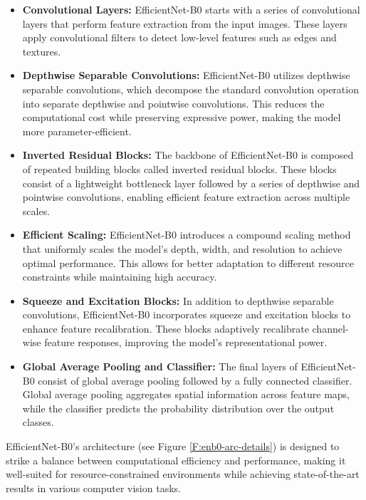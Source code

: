 \documentclass[12pt, a4paper, twoside]{article}
\begin{document}
			\begin{itemize}
				\item \textbf{Convolutional Layers:} EfficientNet-B0 starts with a series of convolutional layers that perform feature extraction from the input images. These layers apply convolutional filters to detect low-level features such as edges and textures.
				
				\item \textbf{Depthwise Separable Convolutions:} EfficientNet-B0 utilizes depthwise separable convolutions, which decompose the standard convolution operation into separate depthwise and pointwise convolutions. This reduces the computational cost while preserving expressive power, making the model more parameter-efficient.
				
				\item \textbf{Inverted Residual Blocks:} The backbone of EfficientNet-B0 is composed of repeated building blocks called inverted residual blocks. These blocks consist of a lightweight bottleneck layer followed by a series of depthwise and pointwise convolutions, enabling efficient feature extraction across multiple scales.
				
				\item \textbf{Efficient Scaling:} EfficientNet-B0 introduces a compound scaling method that uniformly scales the model's depth, width, and resolution to achieve optimal performance. This allows for better adaptation to different resource constraints while maintaining high accuracy.
				
				\item \textbf{Squeeze and Excitation Blocks:} In addition to depthwise separable convolutions, EfficientNet-B0 incorporates squeeze and excitation blocks to enhance feature recalibration. These blocks adaptively recalibrate channel-wise feature responses, improving the model's representational power.
				
				\item \textbf{Global Average Pooling and Classifier:} The final layers of EfficientNet-B0 consist of global average pooling followed by a fully connected classifier. Global average pooling aggregates spatial information across feature maps, while the classifier predicts the probability distribution over the output classes.
			\end{itemize}
			
			EfficientNet-B0's architecture (see Figure \ref{F:enb0-arc-details}) is designed to strike a balance between computational efficiency and performance, making it well-suited for resource-constrained environments while achieving state-of-the-art results in various computer vision tasks.
			
\end{document}
